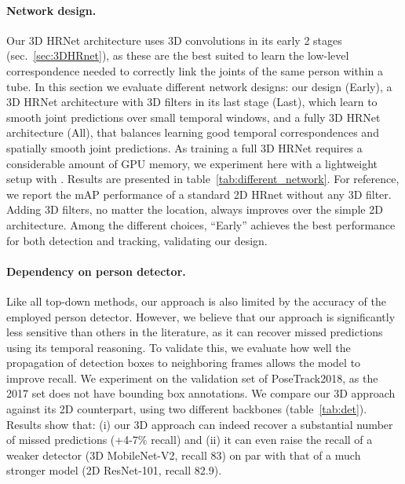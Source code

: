 \documentclass[10pt,twocolumn,letterpaper]{article}
\begin{document}
 \vspace{-3mm}
\paragraph{Network design.}
Our 3D HRNet architecture uses 3D convolutions in its early 2 stages (sec.~\ref{sec:3DHRnet}), as these are the best suited to learn the low-level correspondence needed to correctly link the joints of the same person within a tube. In this section we evaluate different network designs: our design (Early), a 3D HRNet architecture with 3D filters in its last stage (Last), which learn to smooth joint predictions over small temporal windows, and a fully 3D HRNet architecture (All), that balances learning good temporal correspondences and spatially smooth joint predictions.
As training a full 3D HRNet requires a considerable amount of GPU memory, we experiment here with a lightweight setup with . Results are presented in table~\ref{tab:different_network}. For reference, we report the mAP performance of a standard 2D HRnet without any 3D filter. Adding 3D filters, no matter the location, always improves over the simple 2D architecture. Among the different choices, ``Early'' achieves the best performance for both detection and tracking, validating our design.

 \vspace{-3mm}
\paragraph{Dependency on person detector.}
Like all top-down methods, our approach is also limited by the accuracy of the employed person detector. However, we believe that our approach is significantly less sensitive than others in the literature, as it can recover missed predictions using its temporal reasoning. To validate this, we evaluate how well the propagation of detection boxes to neighboring frames allows the model to improve recall. We experiment on the validation set of PoseTrack2018, as the 2017 set does not have bounding box annotations. We compare our 3D approach against its 2D counterpart, using two different backbones (table~\ref{tab:det}). Results show that: (i) our 3D approach can indeed recover a substantial number of missed predictions (+4-7\% recall) and (ii) it can even raise the recall of a weaker detector (3D MobileNet-V2, recall 83) on par with that of a much stronger model (2D ResNet-101, recall 82.9).

\begin{table}
\centering 
{}
\vspace{-3mm}
 \caption{\small \it Person bounding box recall on PoseTrack 2018. \vspace{-3mm}}
 \label{tab:det}
\end{table}
\end{document}
